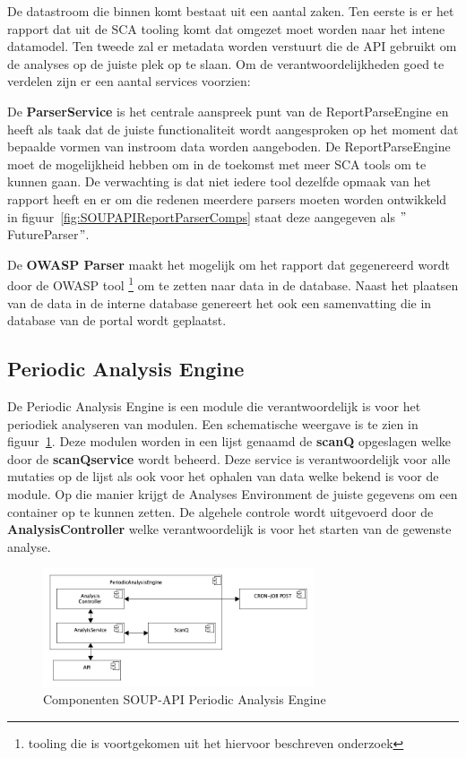 De datastroom die binnen komt bestaat uit een aantal zaken. Ten eerste is er het rapport dat uit de SCA tooling komt dat omgezet moet worden naar het intene datamodel. Ten tweede zal er metadata worden verstuurt die de API gebruikt om de analyses op de juiste plek op te slaan. Om de verantwoordelijkheden goed te verdelen zijn er een aantal services voorzien:

De \textbf{ParserService} is het centrale aanspreek punt van de ReportParseEngine en heeft als taak dat de juiste functionaliteit wordt aangesproken op het moment dat bepaalde vormen van instroom data worden aangeboden. De ReportParseEngine moet de mogelijkheid hebben om in de toekomst met meer SCA tools om te kunnen gaan. De verwachting is dat niet iedere tool dezelfde opmaak van het rapport heeft en er om die redenen meerdere parsers moeten worden ontwikkeld in figuur~\ref{fig:SOUPAPIReportParserComps} staat deze aangegeven als $"$FutureParser$"$.

De \textbf{OWASP Parser} maakt het mogelijk om het rapport dat gegenereerd wordt door de OWASP tool \footnote{tooling die is voortgekomen uit het hiervoor beschreven onderzoek} om te zetten naar data in de database. Naast het plaatsen van de data in de interne database genereert het ook een samenvatting die in database van de portal wordt geplaatst.

\subsection{Periodic Analysis Engine}\label{subsec:periodicanalysisengine}
De Periodic Analysis Engine is een module die verantwoordelijk is voor het periodiek analyseren van modulen. Een schematische weergave is te zien in figuur~\ref{fig:SOUPAPIPeriodicAnalysisEngineComps}. Deze modulen worden in een lijst genaamd de \textbf{scanQ} opgeslagen welke door de \textbf{scanQservice} wordt beheerd. Deze service is verantwoordelijk voor alle mutaties op de lijst als ook voor het ophalen van data welke bekend is voor de module. Op die manier krijgt de Analyses Environment de juiste gegevens om een container op te kunnen zetten. De algehele controle wordt uitgevoerd door de \textbf{AnalysisController} welke verantwoordelijk is voor het starten van de gewenste analyse.

\begin{figure}[bth]
    \myfloatalign
    \includegraphics[width=8cm]{gfx/umlet/exports/PeriodicAnalyisEngineComponents}
    \caption{Componenten SOUP-API Periodic Analysis Engine}
    \label{fig:SOUPAPIPeriodicAnalysisEngineComps}
\end{figure}

